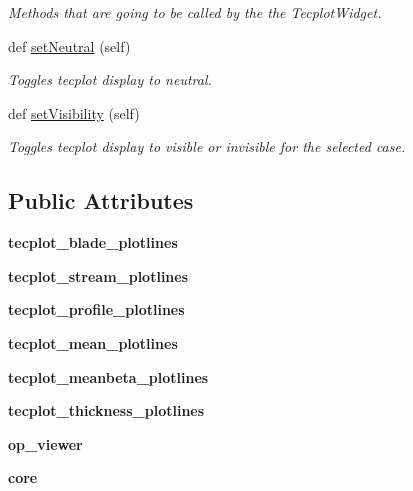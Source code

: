 \begin{DoxyCompactItemize}
\begin{DoxyCompactList}\small\item\em Methods that are going to be called by the the Tecplot\+Widget. \end{DoxyCompactList}\item 
def \hyperlink{a00111_ad80163041f7884f536d1421860c4adc2}{set\+Neutral} (self)
\begin{DoxyCompactList}\small\item\em Toggles tecplot display to neutral. \end{DoxyCompactList}\item 
def \hyperlink{a00111_ae50e0f3c4051d791ed30a2e9de5233ea}{set\+Visibility} (self)
\begin{DoxyCompactList}\small\item\em Toggles tecplot display to visible or invisible for the selected case. \end{DoxyCompactList}\end{DoxyCompactItemize}
\subsection*{Public Attributes}
\begin{DoxyCompactItemize}
\item 
\hypertarget{a00111_a97bc6a6c7074f874028cd2afbbad4082}{}\label{a00111_a97bc6a6c7074f874028cd2afbbad4082} 
{\bfseries tecplot\+\_\+blade\+\_\+plotlines}
\item 
\hypertarget{a00111_a103d285631a0d45198d834c8a98cf72a}{}\label{a00111_a103d285631a0d45198d834c8a98cf72a} 
{\bfseries tecplot\+\_\+stream\+\_\+plotlines}
\item 
\hypertarget{a00111_a20a9b77de151d414f78ab14a5ee30143}{}\label{a00111_a20a9b77de151d414f78ab14a5ee30143} 
{\bfseries tecplot\+\_\+profile\+\_\+plotlines}
\item 
\hypertarget{a00111_ad430a4835103d6c1e22b1d81a829bc74}{}\label{a00111_ad430a4835103d6c1e22b1d81a829bc74} 
{\bfseries tecplot\+\_\+mean\+\_\+plotlines}
\item 
\hypertarget{a00111_a552371e32854caef73cb7386140ebab8}{}\label{a00111_a552371e32854caef73cb7386140ebab8} 
{\bfseries tecplot\+\_\+meanbeta\+\_\+plotlines}
\item 
\hypertarget{a00111_a3291e8bf0c5c69a20e3e9299dc363db2}{}\label{a00111_a3291e8bf0c5c69a20e3e9299dc363db2} 
{\bfseries tecplot\+\_\+thickness\+\_\+plotlines}
\item 
\hypertarget{a00111_a03539a28f4d15d303da92341074ab6b6}{}\label{a00111_a03539a28f4d15d303da92341074ab6b6} 
{\bfseries op\+\_\+viewer}
\item 
\hypertarget{a00111_a7d3fabc52fc4c2d52b9aa4efea25131a}{}\label{a00111_a7d3fabc52fc4c2d52b9aa4efea25131a} 
{\bfseries core}
\end{DoxyCompactItemize}


